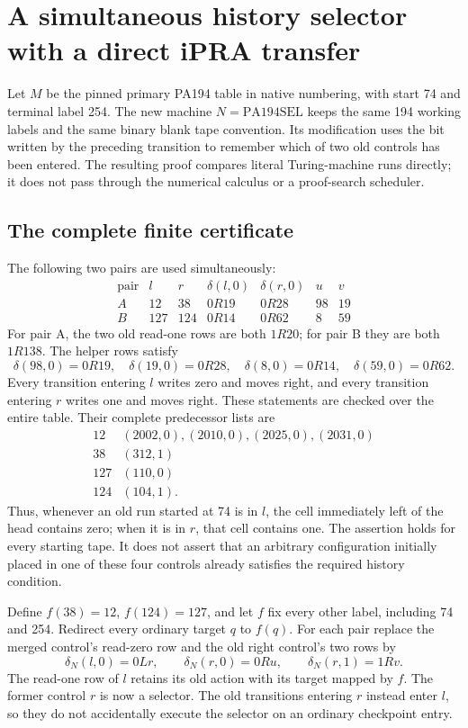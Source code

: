 \section{A simultaneous history selector with a direct iPRA transfer}
\label{sec:history-selector-proof}

Let $M$ be the pinned primary PA194 table in native numbering, with start
74 and terminal label 254.  The new machine $N=\mathrm{PA194SEL}$ keeps
the same 194 working labels and the same binary blank tape convention.
Its modification uses the bit written by the preceding transition to
remember which of two old controls has been entered.  The resulting
proof compares literal Turing-machine runs directly; it does not pass
through the numerical calculus or a proof-search scheduler.

\subsection{The complete finite certificate}

The following two pairs are used simultaneously:
\[
\begin{array}{c|c|c|c|c|c|c}
\text{pair}&l&r&\delta(l,0)&\delta(r,0)&u&v\\\hline
A&12&38&0R19&0R28&98&19\\
B&127&124&0R14&0R62&8&59
\end{array}
\]
For pair A, the two old read-one rows are both $1R20$; for pair B they
are both $1R138$.  The helper rows satisfy
\[
 \delta(98,0)=0R19,\quad \delta(19,0)=0R28,\quad
 \delta(8,0)=0R14,\quad \delta(59,0)=0R62.
\]
Every transition entering $l$ writes zero and moves right, and every
transition entering $r$ writes one and moves right.  These statements
are checked over the entire table.  Their complete predecessor lists are
\[
\begin{array}{c|l}
12&(2002,0),(2010,0),(2025,0),(2031,0)\\
38&(312,1)\\
127&(110,0)\\
124&(104,1).
\end{array}
\]
Thus, whenever an old run started at 74 is in $l$, the cell immediately
left of the head contains zero; when it is in $r$, that cell contains one.
The assertion holds for every starting tape.  It does not assert that an
arbitrary configuration initially placed in one of these four controls
already satisfies the required history condition.

Define $f(38)=12$, $f(124)=127$, and let $f$ fix every other label,
including 74 and 254.  Redirect every ordinary target $q$ to $f(q)$.
For each pair replace the merged control's read-zero row and the old
right control's two rows by
\[
 \delta_N(l,0)=0Lr,\qquad
 \delta_N(r,0)=0Ru,\qquad
 \delta_N(r,1)=1Rv.
\]
The read-one row of $l$ retains its old action with its target mapped by
$f$.  The former control $r$ is now a selector.  The old transitions
entering $r$ instead enter $l$, so they do not accidentally execute the
selector on an ordinary checkpoint entry.

